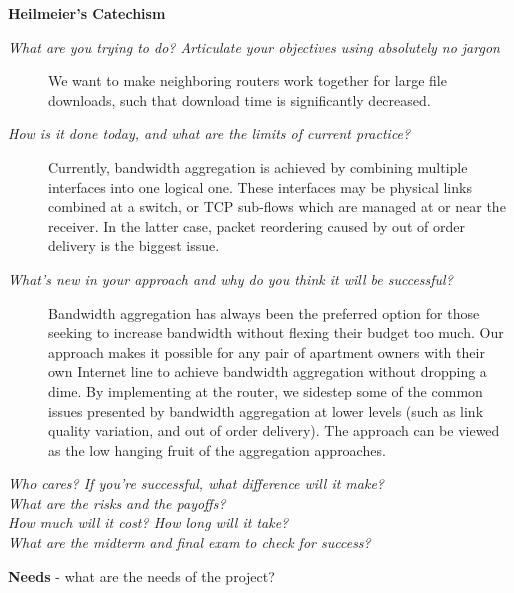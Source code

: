 \documentclass{article}
\begin{document}
{\bf Heilmeier's Catechism}\hfil\\
	\begin{description}
		\item[{\it What are you trying to do? Articulate your objectives using absolutely no jargon}]
			We want to make neighboring routers work together for large file downloads, such that download time is significantly decreased.
		\item[{\it How is it done today, and what are the limits of current practice?\\}]
			Currently, bandwidth aggregation is achieved by combining multiple interfaces into one logical one. These interfaces may be physical links combined at a switch, or TCP sub-flows which are managed at or near the receiver. In the latter case, packet reordering caused by out of order delivery is the biggest issue.

		\item[{\it What's new in your approach and why do you think it will be successful?\\}]

			Bandwidth aggregation has always been the preferred option for those seeking to increase bandwidth without flexing their budget too much. Our approach makes it possible for any pair of apartment owners with their own Internet line to achieve bandwidth aggregation without dropping a dime. By implementing at the router, we sidestep some of the common issues presented by bandwidth aggregation at lower levels (such as link quality variation, and out of order delivery). The approach can be viewed as the low hanging fruit of the aggregation approaches.

		\item[{\it Who cares? If you're successful, what difference will it make?\\}]

		\item[{\it What are the risks and the payoffs?\\}]

		\item[{\it How much will it cost? How long will it take?\\}]

		\item[{\it What are the midterm and final exam to check for success?\\}]

	\end{description}
	{\bf Needs} - what are the needs of the project?\\
\end{document}
